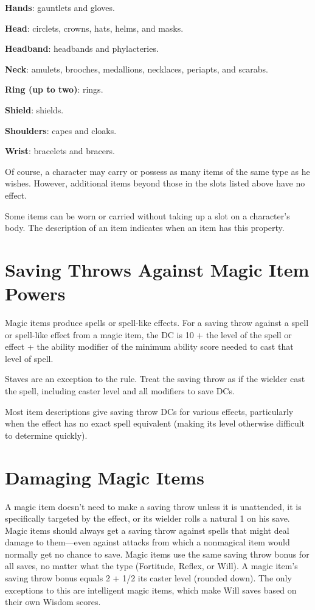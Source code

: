 \textbf{Hands}: gauntlets and gloves.
				
\textbf{Head}: circlets, crowns, hats, helms, and masks.
				
\textbf{Headband}: headbands and phylacteries.
				
\textbf{Neck}: amulets, brooches, medallions, necklaces, periapts, and scarabs.
				
\textbf{Ring (up to two)}: rings.
				
\textbf{Shield}: shields.
				
\textbf{Shoulders}: capes and cloaks.
				
\textbf{Wrist}: bracelets and bracers. 
				
Of course, a character may carry or possess as many items of the same type as he wishes. However, additional items beyond those in the slots listed above have no effect. 
				
Some items can be worn or carried without taking up a slot on a character's body. The description of an item indicates when an item has this property.
				
\section{Saving Throws Against Magic Item Powers}

				
Magic items produce spells or spell-like effects. For a saving throw against a spell or spell-like effect from a magic item, the DC is 10 + the level of the spell or effect + the ability modifier of the minimum ability score needed to cast that level of spell. 
				
Staves are an exception to the rule. Treat the saving throw as if the wielder cast the spell, including caster level and all modifiers to save DCs. 
				
Most item descriptions give saving throw DCs for various effects, particularly when the effect has no exact spell equivalent (making its level otherwise difficult to determine quickly).
				
\section{Damaging Magic Items}

				
A magic item doesn't need to make a saving throw unless it is unattended, it is specifically targeted by the effect, or its wielder rolls a natural 1 on his save. Magic items should always get a saving throw against spells that might deal damage to them---even against attacks from which a nonmagical item would normally get no chance to save. Magic items use the same saving throw bonus for all saves, no matter what the type (Fortitude, Reflex, or Will). A magic item's saving throw bonus equals 2 + 1/2 its caster level (rounded down). The only exceptions to this are intelligent magic items, which make Will saves based on their own Wisdom scores.
				
